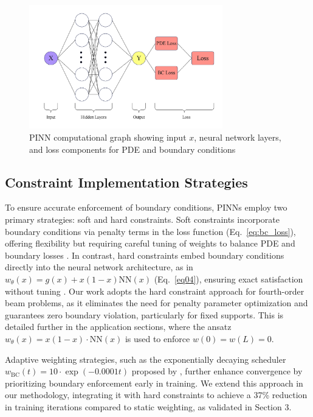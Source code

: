 \documentclass[12pt]{article}
\begin{document}
\begin{figure}[htbp]
	\centering
	\includegraphics[width=0.75\textwidth]{fig.png}
	\caption{PINN computational graph showing input $x$, neural network layers, and loss components for PDE and boundary conditions}
	\label{fig:pinn_arch}
\end{figure}

\subsection{Constraint Implementation Strategies}
To ensure accurate enforcement of boundary conditions, PINNs employ two primary strategies: soft and hard constraints. Soft constraints incorporate boundary conditions via penalty terms in the loss function (Eq.~\ref{eq:bc_loss}), offering flexibility but requiring careful tuning of weights to balance PDE and boundary losses \citep{Raissi2019}. In contrast, hard constraints embed boundary conditions directly into the neural network architecture, as in $w_{\theta}(x) = g(x) + x(1-x)\text{NN}(x)$ (Eq.~\ref{eq04}), ensuring exact satisfaction without tuning \citep{Lu2021}. Our work adopts the hard constraint approach for fourth-order beam problems, as it eliminates the need for penalty parameter optimization and guarantees zero boundary violation, particularly for fixed supports. This is detailed further in the application sections, where the ansatz $w_{\theta}(x) = x(1-x)\cdot\text{NN}(x)$ is used to enforce $w(0) = w(L) = 0$.

Adaptive weighting strategies, such as the exponentially decaying scheduler $w_{\text{BC}}(t)=10\cdot\exp(-0.0001t)$ proposed by \citet{McClenny2022}, further enhance convergence by prioritizing boundary enforcement early in training. We extend this approach in our methodology, integrating it with hard constraints to achieve a 37\% reduction in training iterations compared to static weighting, as validated in Section 3.
\end{document}
